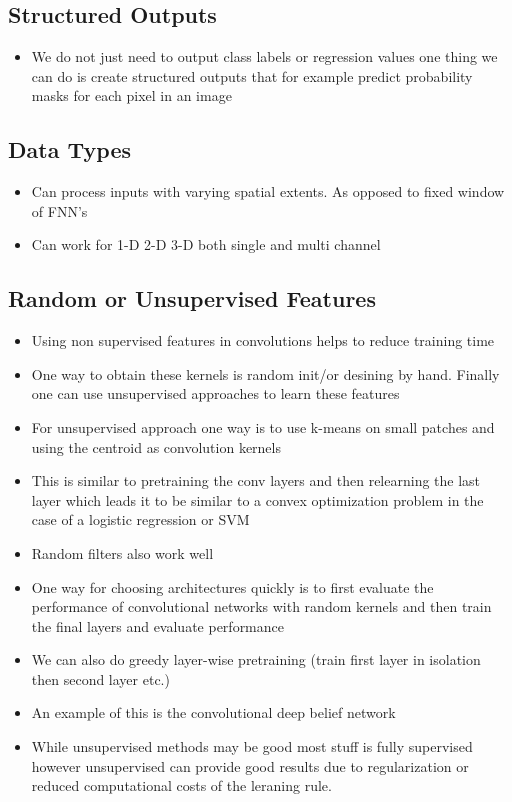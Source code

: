 \documentclass[11pt]{article}
\begin{document}
\subsection{Structured Outputs}
\label{sec:org701de0e}
\begin{itemize}
\item We do not just need to output class labels or regression values one thing we can do is create structured outputs that for example predict probability masks for each pixel in an image
\end{itemize}
\subsection{Data Types}
\label{sec:org8c444dc}
\begin{itemize}
\item Can process inputs with varying spatial extents. As opposed to fixed window of FNN's
\item Can work for 1-D 2-D 3-D both single and multi channel
\end{itemize}
\subsection{Random or Unsupervised Features}
\label{sec:org032ef54}
\begin{itemize}
\item Using non supervised features in convolutions helps to reduce training time
\item One way to obtain these kernels is random init/or desining by hand. Finally one can use unsupervised approaches to learn these features
\item For unsupervised approach one way is to use k-means on small patches and using the centroid as convolution kernels
\item This is similar to pretraining the conv layers and then relearning the last layer which leads it to be similar to a convex optimization problem in the case of a logistic regression or SVM
\item Random filters also work well
\item One way for choosing architectures quickly is to first evaluate the performance of convolutional networks with random kernels and then train the final layers and evaluate performance
\item We can also do greedy layer-wise pretraining (train first layer in isolation then second layer etc.)
\item An example of this is the convolutional deep belief network
\item While unsupervised methods may be good most stuff is fully supervised however unsupervised can provide good results due to regularization or reduced computational costs of the leraning rule.
\end{itemize}
\end{document}
